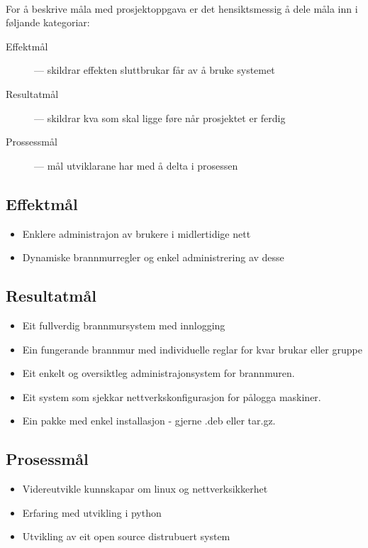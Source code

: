 \documentclass[nynorsk,12pt,a4paper]{article}
\begin{document}
\paragraph{}
For å beskrive måla med prosjektoppgava er det hensiktsmessig å dele måla inn i føljande kategoriar:
\begin{description}
	\item[Effektmål] --- skildrar effekten sluttbrukar får av å bruke systemet
	\item[Resultatmål] --- skildrar kva som skal ligge føre når prosjektet er ferdig
	\item[Prossessmål] --- mål utviklarane har med å delta i prosessen
\end{description}

\subsection{Effektmål}
\begin{itemize}
	\item Enklere administrajon av brukere i midlertidige nett
	\item Dynamiske brannmurregler og enkel administrering av desse
\end{itemize}

\subsection{Resultatmål}
\begin{itemize}
	\item Eit fullverdig brannmursystem med innlogging
	\item Ein fungerande brannmur med individuelle reglar for kvar brukar eller gruppe
	\item Eit enkelt og oversiktleg administrajonsystem for brannmuren.
	\item Eit system som sjekkar nettverkskonfigurasjon for pålogga maskiner.
	\item Ein pakke med enkel installasjon - gjerne .deb eller tar.gz.
\end{itemize}

\subsection{Prosessmål}
\begin{itemize}
	\item Videreutvikle kunnskapar om linux og nettverksikkerhet
	\item Erfaring med utvikling i python
	\item Utvikling av eit open source distrubuert system
\end{itemize}
\end{document}
